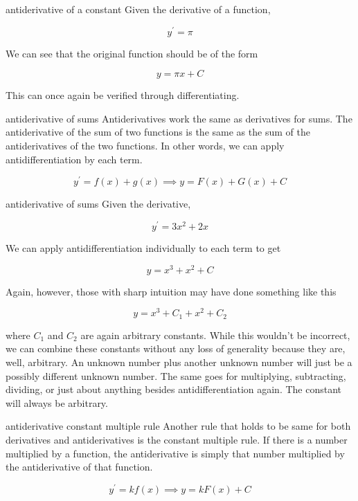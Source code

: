 \begin{example}{antiderivative of a constant}
    Given the derivative of a function,
    
    \[ y^\prime = \pi \]
    
    We can see that the original function should be of the form
    
    \[ y = \pi x + C \]
    
    This can once again be verified through differentiating.
\end{example}

\begin{definition}{antiderivative of sums}
    Antiderivatives work the same as derivatives for sums. The antiderivative of the sum of two functions is the same as the sum of the antiderivatives of the two functions. In other words, we can apply antidifferentiation by each term.

    \[ y^\prime = f \left( x \right) + g \left( x \right) \implies y = F \left( x \right) + G \left( x \right) + C \]
\end{definition}

\begin{example}{antiderivative of sums}
    Given the derivative,
    
    \[ y^\prime = 3x^2 + 2x \]
    
    We can apply antidifferentiation individually to each term to get
    
    \[ y = x^3 + x^2 + C \]
    
    Again, however, those with sharp intuition may have done something like this
    
    \[ y = x^3 + C_1 + x^2 + C_2 \]
    
    where \( C_1 \) and \( C_2 \) are again arbitrary constants. While this wouldn't be incorrect, we can combine these constants without any loss of generality because they are, well, arbitrary. An unknown number plus another unknown number will just be a possibly different unknown number. The same goes for multiplying, subtracting, dividing, or just about anything besides antidifferentiation again. The constant will always be arbitrary.
\end{example}

\begin{definition}{antiderivative constant multiple rule}
    Another rule that holds to be same for both derivatives and antiderivatives is the constant multiple rule. If there is a number multiplied by a function, the antiderivative is simply that number multiplied by the antiderivative of that function.
    
    \[ y^\prime = kf \left( x \right) \implies y = kF \left( x \right) + C \]
\end{definition}

